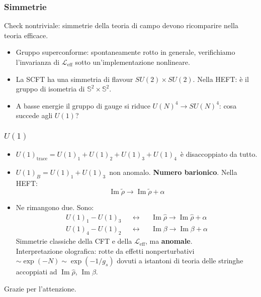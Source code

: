\documentclass[aspectratio=43,mathserif]{beamer}
\newcommand{\ess}{\mathbb{S}}
\newcommand{\hatt}[1]{\ensuremath{\widehat{#1}}}
\newcommand{\tildd}[1]{\ensuremath{\widetilde{#1}}}
\renewcommand{\Im}{\ensuremath{\operatorname{Im}}}
\newcommand{\leff}{\ensuremath{\mathcal{L}_\text{eff}}}
\begin{document}
\begin{frame}
	\frametitle{Simmetrie}
	Check nontriviale: simmetrie della teoria di campo devono ricomparire nella teoria efficace. 
	\begin{itemize}
		\vfill\item Gruppo superconforme: spontaneamente rotto in generale, verifichiamo l'invarianza di $\leff$ sotto un'implementazione nonlineare.
		\vfill\item La SCFT ha una simmetria di flavour $SU(2)\times SU(2)$. Nella HEFT: è il gruppo di isometria di $\ess^2 \times \ess^2$.
		\vfill\item A basse energie il gruppo di gauge si riduce $U(N)^4 \rightarrow SU(N)^4$: cosa succede agli $U(1)$?
	\end{itemize}
\end{frame}


\begin{frame}
	\frametitle{$U(1)$}

	\begin{itemize}
		\vfill\item \small$U(1)_\text{trace} = U(1)_1 + U(1)_2 + U(1)_3 + U(1)_4$\normalsize \, è disaccoppiato da tutto.
		\vfill\item \small$U(1)_B = U(1)_1 + U(1)_3$\normalsize \, non anomalo. \textbf{Numero barionico}. Nella HEFT:
			\begin{equation}
				\Im \tildd \rho \rightarrow \Im \tildd \rho + \alpha
				\label{}
			\end{equation}

		\vfill\vspace{-2pt}\item Ne rimangono due. Sono: \vspace{-4pt}
			\begin{align}
				U(1)_1 - U(1)_3 &&\leftrightarrow && \Im \hatt \rho \rightarrow \Im \hatt \rho + \alpha\\
				U(1)_4 - U(1)_2 &&\leftrightarrow &&\Im\beta \rightarrow \Im\beta + \alpha
			\end{align}
			Simmetrie classiche della CFT e della $\leff$, ma \textbf{anomale}.\\ Interpretazione olografica: rotte da effetti nonperturbativi $\sim \exp(-N) \sim \exp(-1/g_s)$ dovuti a istantoni di teoria delle stringhe accoppiati ad $\Im\hatt\rho$, $\Im\beta$.

	\end{itemize}
\end{frame}

\begin{frame}
	\begin{center}
		Grazie per l'attenzione.
	\end{center}
\end{frame}
\end{document}
